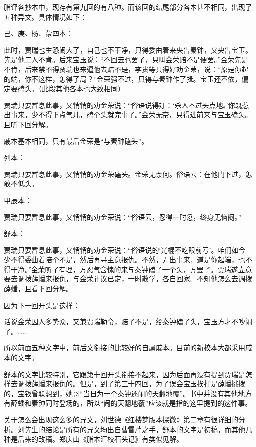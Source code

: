 \href{../Text/part0088.html\#navto_2_a}{}

{{}}

脂评各抄本中，现存有第九回的有八种。而该回的结尾部分各本甚不相同，出现了五种异文。具体情况如下：

己、庚、杨、蒙四本：

此时，贾瑞也生恐闹大了，自己也不干净，只得委曲着来央告秦钟，又央告宝玉。先是他二人不肯。后来宝玉说：“不回去也罢了，只叫金荣赔不是便罢。”金荣先是不肯，后来禁不得贾瑞也来逼他去赔不是，李贵等只得好劝金荣，说：“原是你起的端，你不这样，怎得了局？”金荣强不过，只得与秦钟作了揖。宝玉还不依，偏定要磕头。{（此段其他各本也大致相同）}

贾瑞只要暂息此事，又悄悄的劝金荣说：“俗语说得好：‘杀人不过头点地。’你既惹出事来，少不得下点气儿，磕个头就完事了。”金荣无奈，只得进前来与宝玉磕头。且听下回分解。

戚本基本相同，只有最后金荣是“与秦钟磕头”。

列本：

贾瑞只要暂息此事，又悄悄的劝金荣磕头。金荣无奈何。俗语云：在他门下过，怎敢不低头。

甲辰本：

贾瑞只要暂息此事，又悄悄的劝金荣说：“俗语云，忍得一时忿，终身无恼闷。”

舒本：

贾瑞只要暂息此事，又悄悄的劝金荣说：“俗语说的‘光棍不吃眼前亏’。咱们如今少不得委曲着陪个不是，然后再寻主意报仇。不然，弄出事来，道是你起端，也不得干净。”金荣听了有理，方忍气含愧的来与秦钟磕了一个头，方罢了。贾瑞遂立意要去调拨薛蟠来报仇，与金荣计议已定，一时散学，各自回家。不知他怎么去调拨薛蟠，且看下回分解。

因为下一回开头是这样：

话说金荣因人多势众，又兼贾瑞勒令，赔了不是，给秦钟磕了头，宝玉方才不吵闹了。\ldots{}\ldots{}

所以前面五种文字中，前后文衔接的比较好的自属戚本。目前的新校本大都采用戚本的文字。

舒本的文字比较特别，它跟第十回开头衔接不起来，因为后面再没有提到贾瑞是怎样去调拨薛蟠来报仇的。但是，到了第三十四回，为了误会宝玉挨打是薛蟠挑拨的，宝钗曾联想到，她哥“当日为一个秦钟还闹的天翻地覆”。书中并没有其他地方有薛蟠和秦钟同时登场的，所以“闹的天翻地覆”应该就是指的这里提到的这件事。

关于怎么会出现这么多的异文，刘世德《红楼梦版本探微》第二章有很详细的分析。刘先生的结论是所有的异文均出自曹雪芹之手，舒本的文字是初稿，而其他几种是后来的改稿。郑庆山《脂本汇校石头记》有类似见解。

